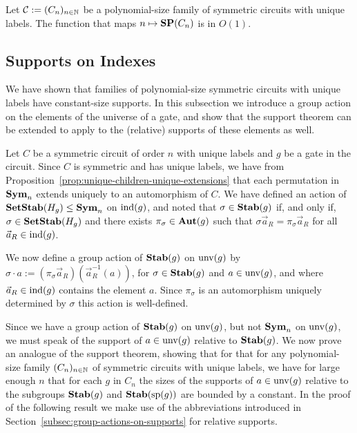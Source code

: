 \documentclass[../paper.tex]{subfiles}
\begin{document}
\begin{cor}
  Let $\mathcal{C} := (C_n)_{n \in \mathbb{N}}$ be a polynomial-size family of
  symmetric circuits with unique labels. The function that maps $n \mapsto
  \text{\textbf{SP}}(C_n) $ is in $O(1)$.
  \label{cor:constant-size-support}
\end{cor}



\subsection{Supports on Indexes}
We have shown that families of polynomial-size symmetric circuits with unique
labels have constant-size supports. In this subsection we introduce a group
action on the elements of the universe of a gate, and show that the support
theorem can be extended to apply to the (relative) supports of these elements as well.

Let $C$ be a symmetric circuit of order $n$ with unique labels and $g$ be a gate
in the circuit. Since $C$ is symmetric and has unique labels, we have from
Proposition~\ref{prop:unique-children-unique-extensions} that each permutation in $\text{\textbf{Sym}}_n$ extends uniquely to an
automorphism of $C$. We have defined an action of $\text{\textbf{SetStab}}(H_g) \leq \text{\textbf{Sym}}_n$ on
$\text{\upshape ind}(g)$, and noted that $\sigma \in \text{\textbf{Stab}}(g)$ if, and only if, $\sigma \in
\text{\textbf{SetStab}}(H_g)$ and there exists $\pi_{\sigma} \in \text{\textbf{Aut}}(g)$ such that $\sigma
\vec{a}_R = \pi_{\sigma} \vec{a}_R$ for all $\vec{a}_R \in \text{\upshape ind}(g)$.

We now define a group action of $\text{\textbf{Stab}}(g)$ on $\text{unv}(g)$ by $\sigma \cdot a
:= (\pi_{\sigma}\vec{a}_R) (\vec{a}^{-1}_R(a))$, for $\sigma \in \text{\textbf{Stab}}(g)$ and
$a \in \text{unv}(g)$, and where $\vec{a}_R \in \text{\upshape ind}(g)$ contains the element
$a$. Since $\pi_{\sigma}$ is an automorphism uniquely determined by $\sigma$
this action is well-defined.

Since we have a group action of $\text{\textbf{Stab}}(g)$ on $\text{unv}(g)$, but not $\text{\textbf{Sym}}_n$
on $\text{unv}(g)$, we must speak of the support of $a \in \text{unv}(g)$ relative
to $\text{\textbf{Stab}}(g)$. We now prove an analogue of the support theorem, showing that for
that for any polynomial-size family $(C_n)_{n \in \mathbb{N}}$ of symmetric circuits
with unique labels, we have for large enough $n$ that for each $g$ in $C_n$ the
sizes of the supports of $a \in \text{unv}(g)$ relative to the subgroups $\text{\textbf{Stab}}(g)$ and
$\text{\textbf{Stab}} (\text{sp} (g))$ are bounded by a constant. In the proof of the following result we
make use of the abbreviations introduced in Section~\ref{subsec:group-actions-on-supports} for relative supports.
\end{document}
